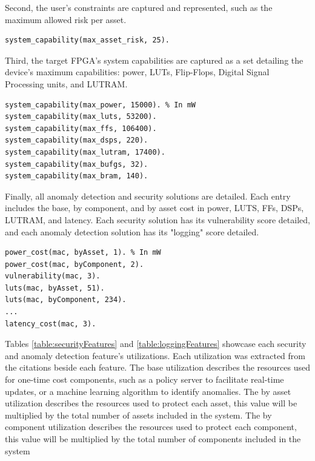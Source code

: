 Second, the user's constraints are captured and represented, such as the maximum allowed risk per asset. 

\begin{verbatim}
system_capability(max_asset_risk, 25).
\end{verbatim}

Third, the target FPGA's system capabilities are captured as a set detailing the device's maximum capabilities: power, LUTs, Flip-Flops, Digital Signal Processing units, and LUTRAM. 

\begin{verbatim}
system_capability(max_power, 15000). % In mW       
system_capability(max_luts, 53200).          
system_capability(max_ffs, 106400).           
system_capability(max_dsps, 220).          
system_capability(max_lutram, 17400).      
system_capability(max_bufgs, 32).        
system_capability(max_bram, 140).
\end{verbatim}
Finally, all anomaly detection and security solutions are detailed. Each entry includes the base, by component, and by asset cost in power, LUTS, FFs, DSPs, LUTRAM, and latency. Each security solution has its vulnerability score detailed, and each anomaly detection solution has its "logging" score detailed.
\begin{verbatim}
power_cost(mac, byAsset, 1). % In mW    
power_cost(mac, byComponent, 2).
vulnerability(mac, 3).
luts(mac, byAsset, 51).           
luts(mac, byComponent, 234).  
...
latency_cost(mac, 3).
\end{verbatim}

Tables \ref{table:securityFeatures} and \ref{table:loggingFeatures} showcase each security and anomaly detection feature's utilizations. Each utilization was extracted from the citations beside each feature. The base utilization describes the resources used for one-time cost components, such as a policy server to facilitate real-time updates, or a machine learning algorithm to identify anomalies. The by asset utilization describes the resources used to protect each asset, this value will be multiplied by the total number of assets included in the system. The by component utilization describes the resources used to protect each component, this value will be multiplied by the total number of components included in the system

